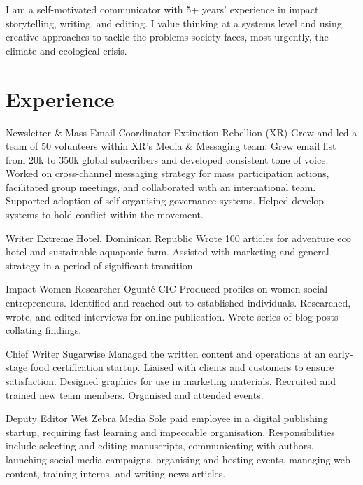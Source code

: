 \documentclass[DIV=15,color=blue!60!green!90]{komacv}
\begin{document}
  \rmfamily

  \maketitle

  \justify
  I am a self-motivated communicator with 5+ years' experience in impact
  storytelling, writing, and editing. I value thinking at a systems level and
  using creative approaches to tackle the problems society faces, most urgently,
  the climate and ecological crisis.

  \raggedright


  \section{Experience}

   {Newsletter \& Mass Email Coordinator}
  {Extinction Rebellion (XR)}
  {}
  {}
  {Grew and led a team of 50 volunteers within XR's Media \& Messaging team.
  Grew email list from 20k to 350k global subscribers and developed consistent
  tone of voice. Worked on cross-channel messaging strategy for mass
  participation actions, facilitated group meetings, and collaborated with an
  international team. Supported adoption of self-organising governance systems.
  Helped develop systems to hold conflict within the movement.}

   {Writer}
  {Extreme Hotel, Dominican Republic}
  {}
  {}
  {Wrote 100 articles for adventure eco hotel and sustainable aquaponic farm.
  Assisted with marketing and general strategy in a period of significant
  transition.}

  {Impact Women Researcher}
  {Ogunt\'e CIC}
  {}
  {}
  {Produced profiles on women social entrepreneurs. Identified and reached out
  to established individuals. Researched, wrote, and edited interviews for
  online publication. Wrote series of blog posts collating findings.}

  {Chief Writer}
  {Sugarwise}
  {}
  {}
  {Managed the written content and operations at an early-stage food
  certification startup. Liaised with clients and customers to ensure
  satisfaction. Designed graphics for use in marketing materials. Recruited and
  trained new team members. Organised and attended events.}

  {Deputy Editor}
  {Wet Zebra Media}
  {}
  {}
  {Sole paid employee in a digital publishing startup, requiring fast learning
  and impeccable organisation. Responsibilities include selecting and editing
  manuscripts, communicating with authors, launching social media campaigns,
  organising and hosting events, managing web content, training interns, and
  writing news articles.}
\end{document}

